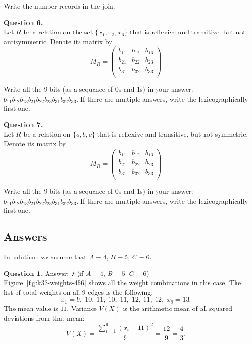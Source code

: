 \documentclass[jou]{apa6}
\begin{document}
Write the number records in the join.

\vspace{6pt}
{\bf Question 6.}\\
Let $R$ be a relation on the set $\{x_1,x_2,x_3\}$ that is reflexive and transitive, but not antisymmetric.
Denote its matrix by
$$M_R =  \left( \begin{array}{ccc}
b_{11} & b_{12} & b_{13} \\
b_{21} & b_{22} & b_{23} \\
b_{31} & b_{32} & b_{33} \\
\end{array} \right)$$

Write all the 9 bits (as a sequence of 0s and 1s) in your answer: $b_{11}b_{12}b_{13}b_{21}b_{22}b_{23}b_{31}b_{32}b_{33}$.
If there are multiple answers, write the lexicographically first one. 



\vspace{6pt}
{\bf Question 7.}\\
Let $R$ be a relation on $\{a, b, c\}$ that is reflexive and transitive, but not symmetric.
Denote its matrix by
$$M_R =  \left( \begin{array}{ccc}
b_{11} & b_{12} & b_{13} \\
b_{21} & b_{22} & b_{23} \\
b_{31} & b_{32} & b_{33} \\
\end{array} \right)$$

Write all the 9 bits (as a sequence of 0s and 1s) in your answer: $b_{11}b_{12}b_{13}b_{21}b_{22}b_{23}b_{31}b_{32}b_{33}$.
If there are multiple answers, write the lexicographically first one. 




\newpage

\subsection{Answers}

In solutions we assume that $A = 4$, $B = 5$, $C = 6$. 

\vspace{6pt}
{\bf Question 1.} Answer: {\tt 7} (if $A = 4$, $B = 5$, $C = 6$)\\ 

Figure~\ref{fig:k33-weights-456} shows all the weight combinations in this case. 
The list of total weights on all $9$ edges is the following: 
$$x_1 = 9,\;10,\;11,\;10,\;11,\;12,\;11,\;12,\;x_9 = 13.$$
The mean value is $11$. Variance $V(X)$ is the arithmetic mean of all squared deviations from that mean:
$$V(X) = \frac{\sum_{i=1}^9 (x_i - 11)^2}{9} = \frac{12}{9} = \frac{4}{3}.$$
\end{document}
